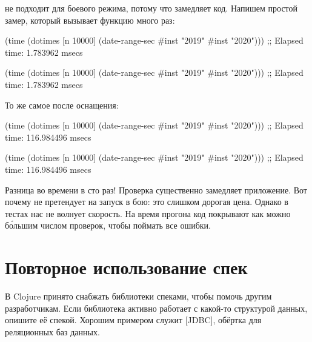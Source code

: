 
 не подходит для боевого режима, потому что замедляет
код. Напишем простой замер, который вызывает функцию много раз:


\ifnarrow

\begin{clojure}
(time
 (dotimes [n 10000]
   (date-range-sec #inst "2019"
                   #inst "2020")))
;; Elapsed time: 1.783962 msecs
\end{clojure}

\else

\begin{clojure}
(time
 (dotimes [n 10000]
   (date-range-sec #inst "2019" #inst "2020")))
;; Elapsed time: 1.783962 msecs
\end{clojure}

\fi

\noindent
То же самое после оснащения:

\pagebreaklarge

\ifnarrow

\begin{clojure}
(time
 (dotimes [n 10000]
   (date-range-sec #inst "2019"
                   #inst "2020")))
;; Elapsed time: 116.984496 msecs
\end{clojure}

\else

\begin{clojure}
(time
 (dotimes [n 10000]
   (date-range-sec #inst "2019" #inst "2020")))
;; Elapsed time: 116.984496 msecs
\end{clojure}

\fi


Разница во времени в сто раз! Проверка существенно замедляет приложение. Вот почему
 не претендует на запуск в бою: это слишком дорогая
цена. Однако в тестах нас не волнует скорость. На время прогона код покрывают
как можно б\'{о}льшим числом проверок, чтобы поймать все ошибки.

\section{Повторное использование спек}


В Clojure принято снабжать библиотеки спеками, чтобы помочь другим
разработчикам. Если библиотека активно работает с какой-то структурой данных,
опишите её спекой. Хорошим примером служит
[JDBC],
обёртка для реляционных баз данных.

